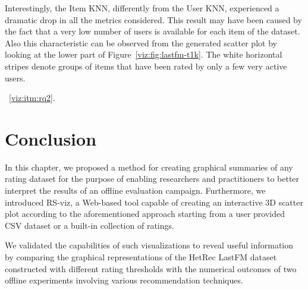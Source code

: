 Interestingly, the Item KNN, differently from the User KNN, experienced a dramatic drop in all the metrics considered. This result may have been caused by the fact that a very low number of users is available for each item of the dataset. Also this characteristic can be observed from the generated scatter plot by looking at the lower part of Figure~\ref{viz:fig:lastfm-t1k}. The white horizontal stripes denote groups of items that have been rated by only a few very active users.

~\ref{viz:itm:rq2}.

\section{Conclusion}
\label{viz:sec:conclusion}

In this chapter, we proposed a method for creating graphical summaries of any rating dataset for the purpose of enabling researchers and practitioners to better interpret the results of an offline evaluation campaign. Furthermore, we introduced RS-viz, a Web-based tool capable of creating an interactive 3D scatter plot according to the aforementioned approach starting from a user provided CSV dataset or a built-in collection of ratings.

We validated the capabilities of such visualizations to reveal useful information by comparing the graphical representations of the HetRec LastFM dataset constructed with different rating thresholds with the numerical outcomes of two offline experiments involving various recommendation techniques.
